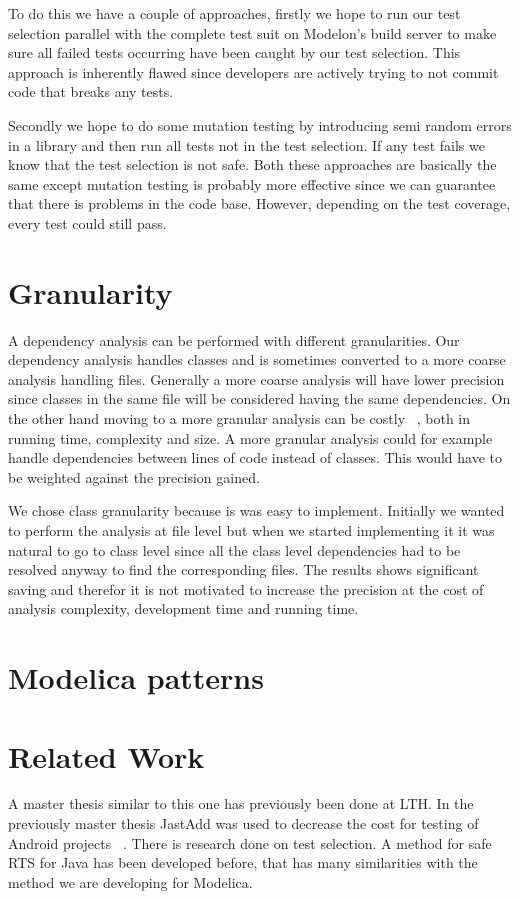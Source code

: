 \documentclass{cslthse-msc}
\begin{document}
To do this we have a couple of approaches, firstly we hope to run our test selection parallel with the complete test suit on Modelon's build server to make sure all failed tests occurring have been caught by our test selection. This approach is inherently flawed since developers are actively trying to not commit code that breaks any tests. %


Secondly we hope to do some mutation testing by introducing semi random errors in a library and then run all tests not in the test selection. If any test fails we know that the test selection is not safe. Both these approaches are basically the same except mutation testing is probably more effective since we can guarantee that there is problems in the code base. However, depending on the test coverage, every test could still pass.


\section{Granularity}
A dependency analysis can be performed with different granularities. Our dependency analysis handles classes and is sometimes converted to a more coarse analysis handling files. Generally a more coarse analysis will have lower precision since classes in the same file will be considered having the same dependencies. On the other hand moving to a more granular analysis can be costly ~\cite{DBLP:conf/sigsoft/LegunsenHSLZM16}, both in running time, complexity and size. A more granular analysis could for example handle dependencies between lines of code instead of classes. This would have to be weighted against the precision gained.

We chose class granularity because is was easy to implement. Initially we wanted to perform the analysis at file level but when we started implementing it it was natural to go to class level since all the class level dependencies had to be resolved anyway to find the corresponding files. The results shows significant saving and therefor it is not motivated to increase the precision at the cost of analysis complexity, development time and running time.

\section{Modelica patterns}


\section{Related Work}
A master thesis similar to this one has previously been done at LTH. In the previously master thesis JastAdd was used to decrease the cost for testing of Android projects ~\cite{kampe2012dependroid}. There is research done on test selection. A method for safe RTS for Java has been developed before, that has many similarities with the method we are developing for Modelica. 
\end{document}
